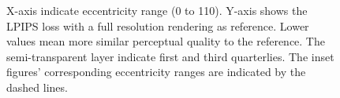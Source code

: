 \begin{figure}[ht]
    {%
    X-axis indicate eccentricity range ($0$ to 110). Y-axis shows the LPIPS loss \cite{zhang2018unreasonable} with a full resolution rendering as reference. Lower values mean more similar perceptual quality to the reference. The semi-transparent layer indicate first and third quarterlies. The inset figures' corresponding eccentricity ranges are indicated by the dashed lines.
    }
    \label{fig:lpips}
\end{figure}